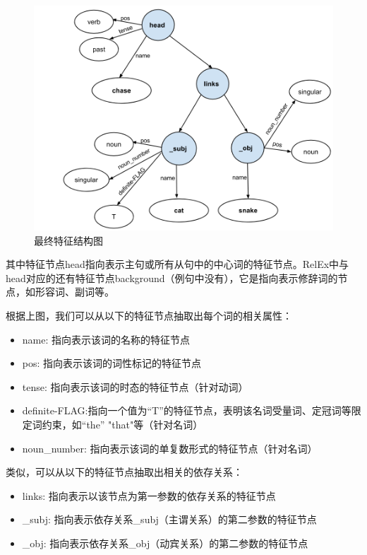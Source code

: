 \begin{figure}
\begin{centering}
\includegraphics[width=12cm]{figures/finalFeatureStructure.png} 
\par\end{centering}

\caption{最终特征结构图\label{fig:finalFeatureStructure}}

\end{figure}

其中特征节点head指向表示主句或所有从句中的中心词的特征节点。RelEx中与head对应的还有特征节点background（例句中没有），它是指向表示修辞词的节点，如形容词、副词等。

\noindent 根据上图，我们可以从以下的特征节点抽取出每个词的相关属性：
\begin{itemize}
\item name: 指向表示该词的名称的特征节点
\item pos: 指向表示该词的词性标记的特征节点
\item tense: 指向表示该词的时态的特征节点（针对动词）
\item definite-FLAG:指向一个值为“T”的特征节点，表明该名词受量词、定冠词等限定词约束，如“the” "that"等（针对名词）
\item noun\_number: 指向表示该词的单复数形式的特征节点（针对名词）
\end{itemize}

\noindent 类似，可以从以下的特征节点抽取出相关的依存关系：
\begin{itemize}
\item links: 指向表示以该节点为第一参数的依存关系的特征节点
\item \_subj: 指向表示依存关系\_subj（主谓关系）的第二参数的特征节点
\item \_obj: 指向表示依存关系\_obj（动宾关系）的第二参数的特征节点
\end{itemize}

